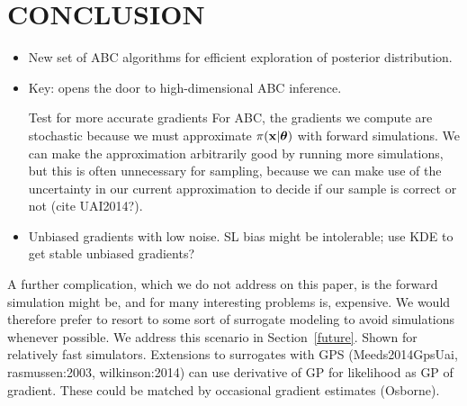 \documentclass[]{article}
\begin{document}

\section{CONCLUSION} \label{sec:conclusion}

\begin{itemize}
  \item New set of ABC algorithms for efficient exploration of posterior distribution.
  \item Key: opens the door to high-dimensional ABC inference.
  \item [Test for more accurate gradients] For ABC, the gradients we compute are stochastic because we must approximate $\pi({\bf x} | {\bm \theta})$ with forward simulations.  We can make the approximation arbitrarily good by running more simulations, but this is often unnecessary for sampling, because we can make use of the uncertainty in our current approximation to decide if our sample is correct or not (cite UAI2014?). 
  \item Unbiased gradients with low noise.  SL bias might be intolerable; use KDE to get stable unbiased gradients?
\end{itemize}

A further complication, which we do not address on this paper, is the forward simulation might be, and for many interesting problems is, expensive.  We would therefore prefer to resort to some sort of surrogate modeling \cite{Meeds2014GpsUai,wilkinson:2014} to avoid simulations whenever possible. We address this scenario in Section~\ref{future}.  Shown for relatively fast simulators.  Extensions to surrogates with GPS (Meeds2014GpsUai, rasmussen:2003, wilkinson:2014) can use derivative of GP for likelihood as GP of gradient.  These could be matched by occasional gradient estimates (Osborne).

\clearpage


\end{document}

